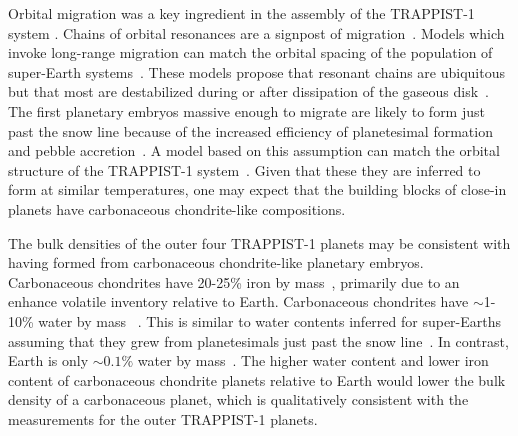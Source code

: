 \documentclass[twocolumn]{aastex63}
\begin{document}
Orbital migration was a key ingredient in the assembly of the TRAPPIST-1 system \citep{Tamayo2017,Ormel2017,Papaloizou2017,MacDonald2018,coleman19}.  Chains of orbital resonances are a signpost of migration~\citep[e.g.]{Cresswell2008}. Models which invoke long-range migration can match the orbital spacing of the population of super-Earth systems~\citep{izidoro17,izidoro19}. These models propose that resonant chains are ubiquitous but that most are destabilized during or after dissipation of the gaseous disk~\citep{terquem07,ogihara09,mcneil10,cossou14}. The first planetary embryos massive enough to migrate are likely to form just past the snow line because of the increased efficiency of planetesimal formation and pebble accretion~\citep{lambrechts14,Ormel2017}. A model based on this assumption can match the orbital structure of the TRAPPIST-1 system~\citep{Schoonenberg2019}. Given that these they are inferred to form at similar temperatures, one may expect that the building blocks of close-in planets have carbonaceous chondrite-like compositions. 

The bulk densities of the outer four TRAPPIST-1 planets may be consistent with having formed from carbonaceous chondrite-like planetary embryos. Carbonaceous chondrites have 20-25\% iron by mass~\citep[see values compiled in][]{lodders98}, primarily due to an enhance volatile inventory relative to Earth.  Carbonaceous chondrites have ${\sim}$1-10\% water by mass~
\citep[and are thought to represent the source population of planetesimals that delivered water to Earth; see][for a review]{meech20}. This is similar to water contents inferred for super-Earths assuming that they grew from planetesimals just past the snow line~\citep{Ormel2017,Schoonenberg2019,bitsch19a,Liu2020}. In contrast, Earth is only ${\sim} 0.1\%$ water by mass~\citep[e.g., ][although uncertainties remain in the core's hydrogen content]{hirschmann06,marty12}. The higher water content and lower iron content of carbonaceous chondrite planets relative to Earth would lower the bulk density of a carbonaceous planet, which is qualitatively consistent with the measurements for the outer TRAPPIST-1 planets. 

\end{document}
